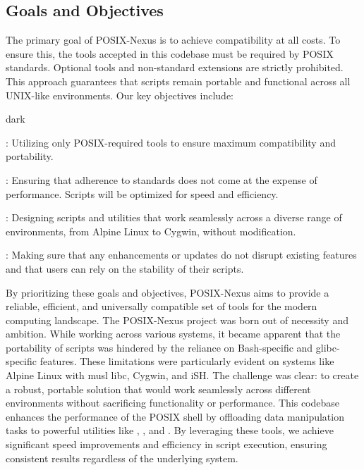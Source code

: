 \subsection{Goals and Objectives}
\label{sec:introduction:sub:goal}
The primary goal of POSIX-Nexus is to achieve compatibility at all costs.
To ensure this, the tools accepted in this codebase must be required by POSIX standards.
Optional tools and non-standard extensions are strictly prohibited.
This approach guarantees that scripts remain portable and functional across all UNIX-like environments.
Our key objectives include:
\bigskip
\begin{baseBoxOne}{}{dark}
    \begin{posnexItemize}
        \item[\sA] : Utilizing only POSIX-required tools to ensure maximum compatibility and portability. 
        \item[\sA] : Ensuring that adherence to standards does not come at the expense of performance. Scripts will be optimized for speed and efficiency. 
        \item[\sA] : Designing scripts and utilities that work seamlessly across a diverse range of environments, from Alpine Linux to Cygwin, without modification. 
        \item[\sA] : Making sure that any enhancements or updates do not disrupt existing features and that users can rely on the stability of their scripts. 
    \end{posnexItemize}
\end{baseBoxOne}
\bigskip
By prioritizing these goals and objectives, POSIX-Nexus aims to provide a reliable, efficient, and universally compatible set of tools for the modern computing landscape.
The POSIX-Nexus project was born out of necessity and ambition. While working across various systems, it became apparent that the portability of scripts was hindered by the reliance on Bash-specific and glibc-specific features. These limitations were particularly evident on systems like Alpine Linux with musl libc, Cygwin, and iSH. The challenge was clear: to create a robust, portable solution that would work seamlessly across different environments without sacrificing functionality or performance.
This codebase enhances the performance of the POSIX shell by offloading data manipulation tasks to powerful utilities like , , and . By leveraging these tools, we achieve significant speed improvements and efficiency in script execution, ensuring consistent results regardless of the underlying system.

